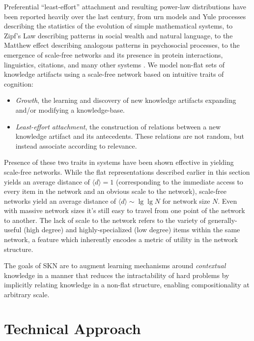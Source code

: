 \documentclass[11pt,letterpaper]{article}
\begin{document}
Preferential ``least-effort'' attachment and resulting power-law
distributions have been reported heavily over the last century, from urn
models and Yule processes describing the statistics of the evolution of
simple mathematical systems, to Zipf's Law describing patterns in social
wealth and natural language, to the Matthew effect describing analogous
patterns in psychosocial processes, to the emergence of scale-free networks
and its presence in protein interactions, linguistics, citations, and many
other systems \cite{yule25}\cite{zipf49}\cite{merton68}\cite{barabasi99}%
\cite{jeong01}\cite{cancho01}\cite{price02}.
We model non-flat sets of knowledge artifacts using a scale-free network
based on intuitive traits of cognition: 
\begin{itemize}
  \item \emph{Growth}, the learning and discovery of new knowledge artifacts
    expanding and/or modifying a knowledge-base.
  \item \emph{Least-effort attachment}, the construction of relations
    between a new knowledge artifact and its antecedents. These relations
    are not random, but instead associate according to relevance.
\end{itemize}
Presence of these two traits in systems have been shown effective in
yielding scale-free networks. While the flat representations described
earlier in this section yields an average distance of $\langle d\rangle=1$
(corresponding to the immediate access to every item in the network and an
obvious scale to the network), scale-free networks yield an average distance
of $\langle d\rangle\sim\lg\lg N$ for network size $N$. Even with massive
network sizes it's still easy to travel from one point of the network to
another. The lack of scale to the network refers to the variety of
generally-useful (high degree) and highly-specialized (low degree) items
within the same network, a feature which inherently encodes a metric of
utility in the network structure.

The goals of SKN are to augment learning mechanisms around \emph{contextual}
knowledge in a manner that reduces the intractability of hard problems by
implicitly relating knowledge in a non-flat structure, enabling
compositionality at arbitrary scale.


\section{Technical Approach}
\end{document}
